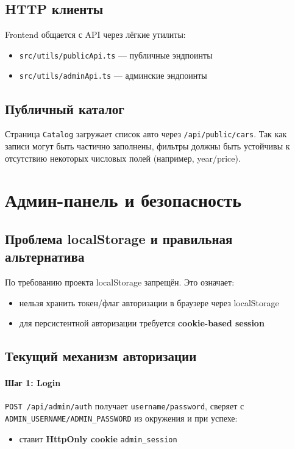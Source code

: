 \documentclass[12pt,a4paper]{article}
\begin{document}
\subsection{HTTP клиенты}
Frontend общается с API через лёгкие утилиты:
\begin{itemize}[leftmargin=18pt]
  \item \texttt{src/utils/publicApi.ts} --- публичные эндпоинты
  \item \texttt{src/utils/adminApi.ts} --- админские эндпоинты
\end{itemize}

\subsection{Публичный каталог}
Страница \texttt{Catalog} загружает список авто через \texttt{/api/public/cars}. Так как записи могут быть частично заполнены, фильтры должны быть устойчивы к отсутствию некоторых числовых полей (например, year/price).

\section{Админ-панель и безопасность}
\subsection{Проблема localStorage и правильная альтернатива}
По требованию проекта localStorage запрещён. Это означает:
\begin{itemize}[leftmargin=18pt]
  \item нельзя хранить токен/флаг авторизации в браузере через localStorage
  \item для персистентной авторизации требуется \textbf{cookie-based session}
\end{itemize}

\subsection{Текущий механизм авторизации}
\paragraph{Шаг 1: Login}
\texttt{POST /api/admin/auth} получает \texttt{username/password}, сверяет с \texttt{ADMIN\_USERNAME/ADMIN\_PASSWORD} из окружения и при успехе:
\begin{itemize}[leftmargin=18pt]
  \item ставит \textbf{HttpOnly cookie} \texttt{admin\_session}
\end{itemize}
\end{document}
